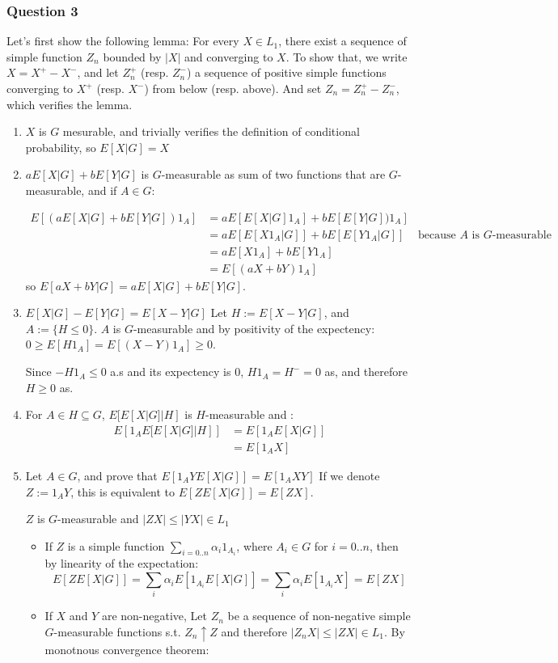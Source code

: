 \documentclass[12pt]{article}
\newcommand{\Q}[1]{\subsubsection*{Question #1}}
\begin{document}
\Q{3}
Let's first show the following lemma:
For every $X \in L_1$, there exist a sequence of simple function $Z_n$ bounded by $|X|$ and converging to $X$.
To show that, we write $X = X^+ - X^-$, and let $Z_n^+$ (resp. $Z_n^-$)  a sequence of positive simple functions converging to $X^+$ (resp. $X^-$) from below (resp. above). And set $Z_n = Z_n^+ - Z_n^-$, which verifies the lemma.


\begin{enumerate}
\item $X$ is $G$ mesurable, and trivially verifies the definition of conditional probability, so $E[X|G] = X$
\item $aE[X|G] + bE[Y|G]$ is $G$-measurable as sum of two functions that are $G$-measurable, and if $A \in G$:

\begin{align*}
E[ (aE[X|G]+bE[Y|G])1_A ] &= a E[E[X|G]1_A]+ bE[E[Y|G])1_A]
\\&= a E[E[X1_A|G]]+ bE[E[Y1_A|G]] &\text{because $A$ is $G$-measurable}
\\&= a E[X 1_A]+ b E[Y 1_A]
\\&=  E[(aX +bY) 1_A]
\end{align*}
 so $E[aX+bY|G] = aE[X|G]+bE[Y|G]$.
\item 
$E[X | G] - E[Y | G] = E[X - Y | G]$
Let $H := E[X - Y | G]$, and $A := \{H \le 0\}$. $A$ is $G$-measurable and by positivity of the expectency: $0 \ge E[H 1_A] = E[(X-Y) 1_A] \ge 0$.

Since $-H1_A \le 0$ a.s and its expectency is 0,  $H1_A = H^- = 0$ as, and therefore $H \ge 0$ as.
\item For $A \in H \subseteq G$, $E[E[X|G] | H]$ is $H$-measurable and :
\begin{align*}
E\left[1_A E[E[X|G] | H]\right] 
&= E[ 1_A E[X|G] ] 
\\&= E[ 1_A X ] 
\end{align*}


\item Let $A \in G$, and prove that $E[ 1_A Y E[X|G] ] = E[1_A XY ]$
If we denote $Z := 1_A Y$, this is equivalent to $E[ Z E[X|G] ] = E[ZX ]$.

 $Z$ is $G$-measurable and $|ZX| \le |YX| \in L_1$
\begin{itemize}
\item If $Z$ is a simple function $\sum_{i=0..n} \alpha_i 1_{A_i}$, where $A_i \in G$ for $i = 0..n$, then by linearity of the expectation:
$$E[ Z E[X|G] ] = \sum_i \alpha_i E[1_{A_i} E[X|G]] = \sum_i \alpha_i E[1_{A_i} X] = E[ZX]$$
\item If $X$ and $Y$ are non-negative, Let $Z_n$ be a sequence of non-negative simple $G$-measurable functions s.t. $Z_n \uparrow Z$ and therefore 
$|Z_nX| \le |ZX| \in L_1$. By monotnous convergence theorem:


\end{itemize}
\end{enumerate}
\end{document}
